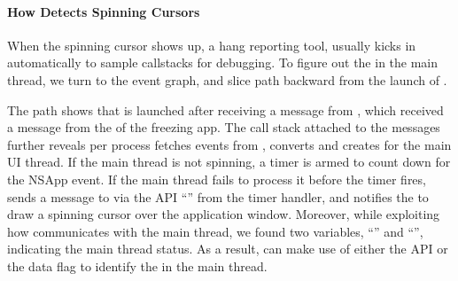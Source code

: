 
\paragraph{How \xxx Detects Spinning Cursors}
When the spinning cursor shows up, a hang reporting tool, \spindump usually
kicks in automatically to sample callstacks for debugging. To figure out the
\spinningnode in the main thread, we turn to the event graph, and slice path
backward from the launch of \spindump.

The path shows that \spindump is launched after receiving a message from
, which received a message from the  of
the freezing app. The call stack attached to the messages further reveals
 per process fetches  events from
, converts and creates  for the main UI
thread. If the main thread is not spinning, a timer is armed to count down
for the NSApp event. If the main thread fails to process it before the timer
fires,  sends a message to  via the API
``'' from the timer handler, and 
notifies the  to draw a spinning cursor over the application
window. Moreover, while exploiting how  communicates with
the main thread, we found two variables, ``'' and
``'', indicating the main thread status. As a
result, \xxx can make use of either the API or the data flag to identify the
\spinningnode in the main thread.
